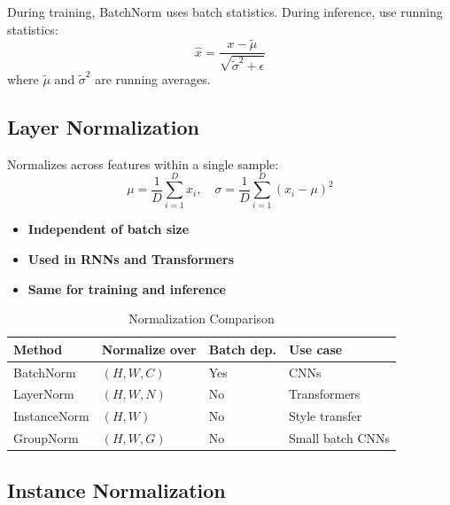 \begin{note}
During training, BatchNorm uses batch statistics. During inference, use running statistics:
\begin{equation}
\hat{x} = \frac{x - \tilde{\mu}}{\sqrt{\tilde{\sigma}^2 + \epsilon}}
\end{equation}
where $\tilde{\mu}$ and $\tilde{\sigma}^2$ are running averages.
\end{note}

\subsection{Layer Normalization}

Normalizes across features within a single sample:
\begin{equation}
\mu = \frac{1}{D}\sum_{i=1}^{D} x_i, \quad \sigma = \frac{1}{D}\sum_{i=1}^{D}(x_i - \mu)^2
\end{equation}

\begin{itemize}
    \item \textbf{Independent of batch size}
    \item \textbf{Used in RNNs and Transformers}
    \item \textbf{Same for training and inference}
\end{itemize}

\begin{table}[ht]
    \centering
    \caption{Normalization Comparison}
    \begin{tabular}{L{2cm} L{2.5cm} L{2.5cm} L{3cm}}
        \toprule
        \textbf{Method} & \textbf{Normalize over} & \textbf{Batch dep.} & \textbf{Use case} \\
        \midrule
        BatchNorm & $(H, W, C)$ & Yes & CNNs \\
        LayerNorm & $(H, W, N)$ & No & Transformers \\
        InstanceNorm & $(H, W)$ & No & Style transfer \\
        GroupNorm & $(H, W, G)$ & No & Small batch CNNs \\
        \bottomrule
    \end{tabular}
\end{table}

\subsection{Instance Normalization}

